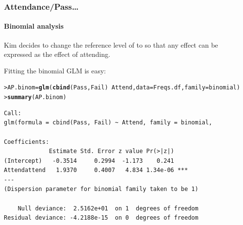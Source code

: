 \documentclass{beamer}\usepackage[]{graphicx}\usepackage[]{xcolor}
\makeatletter
\newcommand{\hlopt}[1]{\textcolor[rgb]{0,0,0}{#1}}%
\newcommand{\hlstd}[1]{\textcolor[rgb]{0.345,0.345,0.345}{#1}}%
\newcommand{\hlkwb}[1]{\textcolor[rgb]{0.69,0.353,0.396}{#1}}%
\newcommand{\hlkwc}[1]{\textcolor[rgb]{0.333,0.667,0.333}{#1}}%
\newcommand{\hlkwd}[1]{\textcolor[rgb]{0.737,0.353,0.396}{\textbf{#1}}}%
\newenvironment{kframe}{%
 \def\at@end@of@kframe{}%
 \ifinner\ifhmode%
  \def\at@end@of@kframe{\end{minipage}}%
  \begin{minipage}{\columnwidth}%
 \fi\fi%
 \def\FrameCommand##1{\hskip\@totalleftmargin \hskip-\fboxsep
 \colorbox{shadecolor}{##1}\hskip-\fboxsep
     \hskip-\linewidth \hskip-\@totalleftmargin \hskip\columnwidth}%
 \MakeFramed {\advance\hsize-\width
   \@totalleftmargin\z@ \linewidth\hsize
   \@setminipage}}%
 {\par\unskip\endMakeFramed%
 \at@end@of@kframe}
\newenvironment{knitrout}{}{} %
\makeatother
\begin{document}
\begin{frame}[fragile]
\frametitle{Attendance/Pass\ldots}
\framesubtitle{Binomial analysis}
Kim decides to change the reference level of  to  so that any effect can be expressed as the effect of attending.
\bigskip



Fitting the binomial GLM is easy:
\begin{knitrout}\scriptsize
{}\color{fgcolor}\begin{kframe}
\begin{alltt}
\hlstd{> }\hlstd{AP.binom}\hlkwb{=}\hlkwd{glm}\hlstd{(}\hlkwd{cbind}\hlstd{(Pass,Fail)}\hlopt{~}\hlstd{Attend,}\hlkwc{data}\hlstd{=Freqs.df,}\hlkwc{family}\hlstd{=binomial)}
\hlstd{> }\hlkwd{summary}\hlstd{(AP.binom)}
\end{alltt}
\end{kframe}
\end{knitrout}

\begin{knitrout}\scriptsize
{}\color{fgcolor}\begin{kframe}
\begin{verbatim}
Call:
glm(formula = cbind(Pass, Fail) ~ Attend, family = binomial, 

Coefficients:
             Estimate Std. Error z value Pr(>|z|)    
(Intercept)   -0.3514     0.2994  -1.173    0.241    
Attendattend   1.9370     0.4007   4.834 1.34e-06 ***
---
(Dispersion parameter for binomial family taken to be 1)

    Null deviance:  2.5162e+01  on 1  degrees of freedom
Residual deviance: -4.2188e-15  on 0  degrees of freedom
\end{verbatim}
\end{kframe}
\end{knitrout}
\end{frame}
\end{document}
